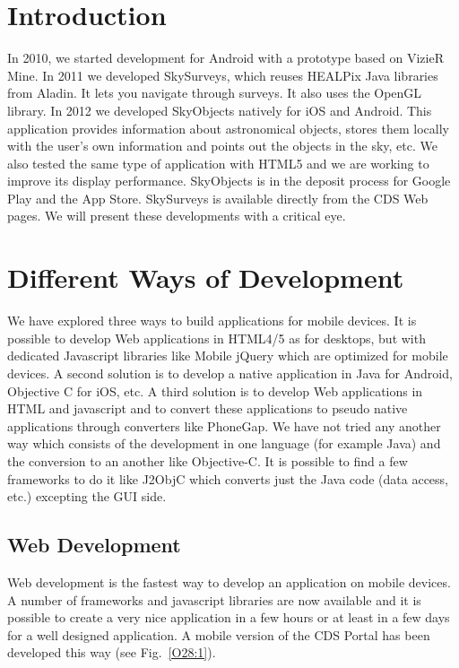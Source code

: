 \section{Introduction}
In 2010, we started development for Android with a prototype based on VizieR Mine. In 2011 we developed SkySurveys, which reuses HEALPix Java libraries from Aladin. It lets you navigate through surveys. It also uses the OpenGL library. In 2012 we developed SkyObjects natively for iOS and Android. This application provides information about astronomical objects, stores them locally with the user's own information and points out the objects in the sky, etc. We also tested the same type of application with HTML5 and we are working to improve its display performance. SkyObjects is in the deposit process for Google Play and the App Store. SkySurveys is available directly from the CDS Web pages. We will present these developments with a critical eye. 

\section{Different Ways of Development}

We have explored three ways to build applications for mobile devices.
It is possible to develop Web applications in HTML4/5 as for desktops, but with dedicated Javascript libraries like Mobile jQuery which are optimized for mobile devices. A second solution is to develop a native application in Java for Android, Objective C for iOS, etc. 
A third solution is to develop Web applications in HTML and javascript and to convert these applications to pseudo native applications through converters like PhoneGap. We have not tried any another way which consists of the development in one language (for example Java) and the conversion to an another like Objective-C. It is possible to find a few frameworks to do it like J2ObjC which converts just the Java code (data access, etc.) excepting the GUI side.

\subsection{Web Development}
Web development is the fastest way to develop an application on mobile devices. A number of frameworks and javascript libraries are now available and it is possible to create a very nice application in a few hours or at least in a few days for a well designed application. A mobile version of the CDS Portal has been developed this way (see Fig.~\ref{O28:1}).

